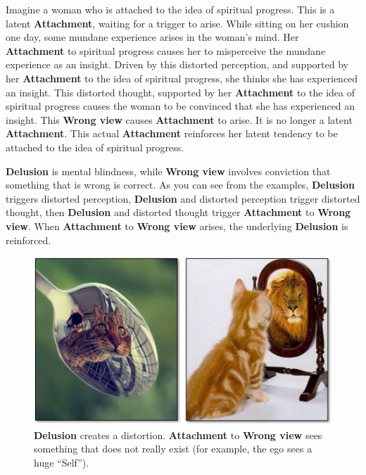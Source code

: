 Imagine a woman who is attached to the idea of spiritual progress. This is a latent \textbf{Attachment}, waiting for a trigger to  arise. While sitting on her cushion one day, some mundane experience arises in the woman’s mind. Her \textbf{Attachment} to spiritual progress causes her to misperceive the mundane experience as an insight. Driven by this distorted perception, and supported by her \textbf{Attachment} to the idea of spiritual progress, she thinks she has experienced an insight. This distorted thought, supported by her \textbf{Attachment} to the idea of spiritual progress causes the woman to be convinced that she has experienced an insight. This \textbf{Wrong view} causes \textbf{Attachment} to arise. It is no longer a latent \textbf{Attachment}. This actual \textbf{Attachment} reinforces her latent tendency to be attached to the idea of spiritual progress.

\textbf{Delusion} is mental blindness, while \textbf{Wrong view} involves conviction that something that is wrong is correct. As you can see from the examples, \textbf{Delusion} triggers distorted perception, \textbf{Delusion} and distorted perception trigger distorted thought, then \textbf{Delusion} and distorted thought trigger \textbf{Attachment} to \textbf{Wrong view}. When \textbf{Attachment} to \textbf{Wrong view} arises, the underlying \textbf{Delusion} is reinforced.

\begin{figure}[H]

\centering
\includegraphics[width=0.7\linewidth]{./Diagrams/Cats}
\caption{\textbf{Delusion} creates a distortion. \textbf{Attachment} to \textbf{Wrong view} sees something that does not really exist (for example, the ego sees a huge “Self”).}
\label{fig:Cats}
\end{figure}

